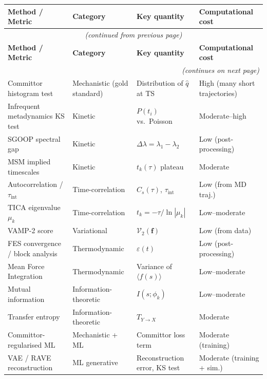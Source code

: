 \documentclass[12pt, a4paper]{article}
\begin{document}
\begin{longtable}{@{}p{3.2cm}p{3.0cm}p{3.0cm}p{3.2cm}@{}}
\toprule
\textbf{Method / Metric} & \textbf{Category} & 
\textbf{Key quantity} & \textbf{Computational cost} \\
\midrule
\endfirsthead
\multicolumn{4}{c}{\small\itshape (continued from previous page)}\\
\toprule
\textbf{Method / Metric} & \textbf{Category} & 
\textbf{Key quantity} & \textbf{Computational cost} \\
\midrule
\endhead
\midrule
\multicolumn{4}{r}{\small\itshape (continues on next page)}\\
\endfoot
\bottomrule
\endlastfoot

Committor histogram test & 
Mechanistic (gold standard) & 
Distribution of $\hat{q}$ at TS & 
High (many short trajectories) \\[3pt]

Infrequent metadynamics KS test & 
Kinetic & 
$P(t_i)$ vs.\ Poisson & 
Moderate--high \\[3pt]

SGOOP spectral gap & 
Kinetic & 
$\Delta\lambda = \lambda_1-\lambda_2$ & 
Low (post-processing) \\[3pt]

MSM implied timescales & 
Kinetic & 
$t_k(\tau)$ plateau & 
Moderate \\[3pt]

Autocorrelation / 
$\tau_{\mathrm{int}}$ & 
Time-correlation & 
$C_s(\tau)$, $\tau_{\mathrm{int}}$ & 
Low (from MD traj.) \\[3pt]

TICA eigenvalue $\mu_k$ & 
Time-correlation & 
$t_k = -\tau/\ln|\mu_k|$ & 
Low--moderate \\[3pt]

VAMP-2 score & 
Variational & 
$\mathcal{V}_2(\mathbf{f})$ & 
Low (from data) \\[3pt]

FES convergence / block analysis & 
Thermodynamic & 
$\varepsilon(t)$ & 
Low (post-processing) \\[3pt]

Mean Force Integration & 
Thermodynamic & 
Variance of $\langle f(s)\rangle$ & 
Low--moderate \\[3pt]

Mutual information & 
Information-theoretic & 
$I(s;\phi_k)$ & 
Low--moderate \\[3pt]

Transfer entropy & 
Information-theoretic & 
$T_{Y\to X}$ & 
Moderate \\[3pt]

Committor-regularised ML & 
Mechanistic + ML & 
Committor loss term & 
Moderate (training) \\[3pt]

VAE / RAVE reconstruction & 
ML generative & 
Reconstruction error, KS test & 
Moderate (training + sim.) \\[3pt]

\end{longtable}
\label{tab:summary}
\end{document}
